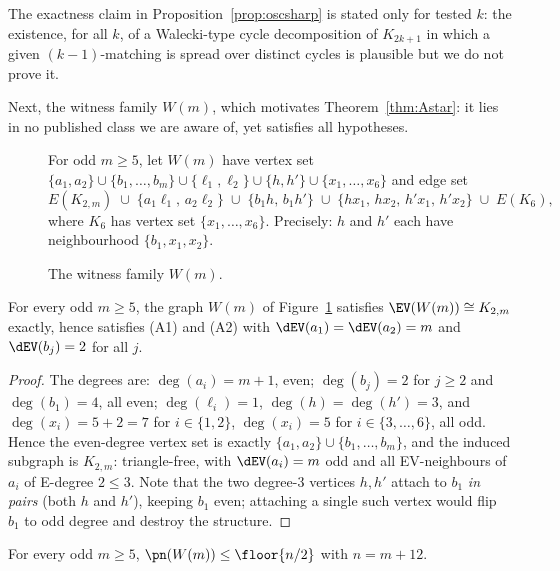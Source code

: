 \begin{remark}
The exactness claim in Proposition~\ref{prop:oscsharp} is stated only for tested $k$: the
existence, for all $k$, of a Walecki-type cycle decomposition of $K_{2k+1}$ in which a given
$(k-1)$-matching is spread over distinct cycles is plausible but we do not prove it.
\end{remark}

Next, the witness family $W(m)$, which motivates Theorem~\ref{thm:Astar}: it lies in no
published class we are aware of, yet satisfies all hypotheses.

\begin{figure}[h]
\centering
\begin{minipage}{0.92\textwidth}\small
For odd $m\ge 5$, let $W(m)$ have vertex set
$\{a_1,a_2\}\cup\{b_1,\dots,b_m\}\cup\{\ell_1,\ell_2\}\cup\{h,h'\}\cup\{x_1,\dots,x_6\}$ and
edge set
\[
E(K_{2,m}) \;\cup\; \{a_1\ell_1,\,a_2\ell_2\} \;\cup\;
\{b_1h,\,b_1h'\} \;\cup\; \{hx_1,\,hx_2,\,h'x_1,\,h'x_2\} \;\cup\; E(K_6),
\]
where $K_6$ has vertex set $\{x_1,\dots,x_6\}$. Precisely: $h$ and $h'$ each have neighbourhood
$\{b_1,x_1,x_2\}$.
\end{minipage}
\caption{The witness family $W(m)$.}\label{fig:Wm}
\end{figure}

\begin{lemma}\label{lem:WmEV}
For every odd $m\ge 5$, the graph $W(m)$ of Figure~\ref{fig:Wm} satisfies
$\EV(W(m))\cong K_{2,m}$ exactly, hence satisfies (A1) and (A2) with $\dEV(a_1)=\dEV(a_2)=m$
and $\dEV(b_j)=2$ for all $j$.
\end{lemma}

\begin{proof}
The degrees are:
$\deg(a_i)=m+1$, even; $\deg(b_j)=2$ for $j\ge2$ and $\deg(b_1)=4$, all even;
$\deg(\ell_i)=1$, $\deg(h)=\deg(h')=3$, and $\deg(x_i)=5+2=7$ for $i\in\{1,2\}$,
$\deg(x_i)=5$ for $i\in\{3,\dots,6\}$, all odd. Hence the even-degree vertex set is exactly
$\{a_1,a_2\}\cup\{b_1,\dots,b_m\}$, and the induced subgraph is $K_{2,m}$: triangle-free, with
$\dEV(a_i)=m$ odd and all EV-neighbours of $a_i$ of E-degree $2\le3$. Note that the two
degree-$3$ vertices $h,h'$ attach to $b_1$ \emph{in pairs} (both $h$ and $h'$), keeping $b_1$
even; attaching a single such vertex would flip $b_1$ to odd degree and destroy the structure.
\end{proof}

\begin{proposition}\label{prop:Wmbound}
For every odd $m\ge 5$, $\pn(W(m))\le\floor{n/2}$ with $n=m+12$.
\end{proposition}

